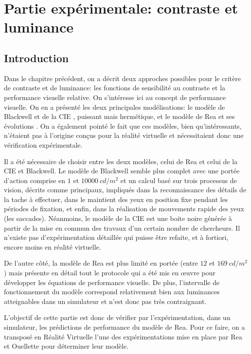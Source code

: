 \part{Partie expérimentale: contraste et luminance}

\chapter*{Introduction}
\par Dans le chapitre précédent, on a décrit deux approches possibles pour le critère de contraste et de luminance: les fonctions de sensibilité au contraste et la performance visuelle relative. On s'intéresse ici au concept de performance visuelle. On en a présenté les deux principales modélisations: le modèle de Blackwell et de la CIE \citep{blackwell_ieri:_1971}, puissant mais hermétique, et le modèle de Rea et ses évolutions \citep{rea_toward_1986}. On a également pointé le fait que ces modèles, bien qu'intéressants, n'étaient pas à l'origine conçus pour la réalité virtuelle et nécessitaient donc une vérification expérimentale.

\par Il a été nécessaire de choisir entre les deux modèles, celui de Rea et celui de la CIE et Blackwell. Le modèle de Blackwell semble plus complet avec une portée d'action comprise en $1$ et $10000~cd/m^2$ et un calcul basé sur trois processus de vision, décrits comme principaux, impliqués dans la reconnaissance des détails de la tache à effectuer, dans le maintient des yeux en position fixe pendant les périodes de fixation, et enfin, dans la réalisation de mouvements rapide des yeux (les saccades). Néanmoins, le modèle de la CIE est une boite noire générée à partir de la mise en commun des travaux d'un certain nombre de chercheurs. Il n'existe pas d'expérimentation détaillée qui puisse être refaite, et à fortiori, encore moins en réalité virtuelle.

\par De l'autre côté, la modèle de Rea est plus limité en portée (entre $12$ et $169~cd/m^2$) mais présente en détail tout le protocole qui a été mis en œuvre pour développer les équations de performance visuelle. De plus, l'intervalle de fonctionnement du modèle correspond relativement bien aux luminances atteignables dans un simulateur et n'est donc pas très contraignant.

\par L'objectif de cette partie est donc de vérifier par l'expérimentation, dans un simulateur, les prédictions de performance du modèle de Rea. Pour ce faire, on a transposé en Réalité Virtuelle l'une des expérimentations mise en place par Rea et Ouellette pour déterminer leur modèle.